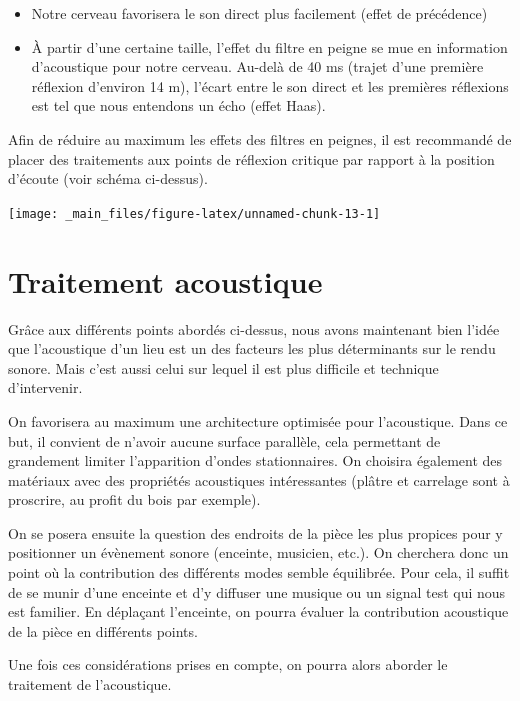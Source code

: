 \documentclass[
]{book}
\providecommand{\tightlist}{%
  \setlength{\itemsep}{0pt}\setlength{\parskip}{0pt}}
\begin{document}
\begin{itemize}
\tightlist
\item
  Notre cerveau favorisera le son direct plus facilement (effet de précédence)
\item
  À partir d'une certaine taille, l'effet du filtre en peigne se mue en information d'acoustique pour notre cerveau. Au-delà de 40 ms (trajet d'une première réflexion d'environ 14 m), l'écart entre le son direct et les premières réflexions est tel que nous entendons un écho (effet Haas).
\end{itemize}

Afin de réduire au maximum les effets des filtres en peignes, il est recommandé de placer des traitements aux points de réflexion critique par rapport à la position d'écoute (voir schéma ci-dessus).

\begin{center}\texttt{[image: \_main\_files/figure-latex/unnamed-chunk-13-1]} \end{center}

\hypertarget{traitement-acoustique}{%
\section{Traitement acoustique}\label{traitement-acoustique}}

Grâce aux différents points abordés ci-dessus, nous avons maintenant bien l'idée que l'acoustique d'un lieu est un des facteurs les plus déterminants sur le rendu sonore. Mais c'est aussi celui sur lequel il est plus difficile et technique d'intervenir.

On favorisera au maximum une architecture optimisée pour l'acoustique. Dans ce but, il convient de n'avoir aucune surface parallèle, cela permettant de grandement limiter l'apparition d'ondes stationnaires. On choisira également des matériaux avec des propriétés acoustiques intéressantes (plâtre et carrelage sont à proscrire, au profit du bois par exemple).

On se posera ensuite la question des endroits de la pièce les plus propices pour y positionner un évènement sonore (enceinte, musicien, etc.). On cherchera donc un point où la contribution des différents modes semble équilibrée. Pour cela, il suffit de se munir d'une enceinte et d'y diffuser une musique ou un signal test qui nous est familier. En déplaçant l'enceinte, on pourra évaluer la contribution acoustique de la pièce en différents points.

Une fois ces considérations prises en compte, on pourra alors aborder le traitement de l'acoustique.
\end{document}
